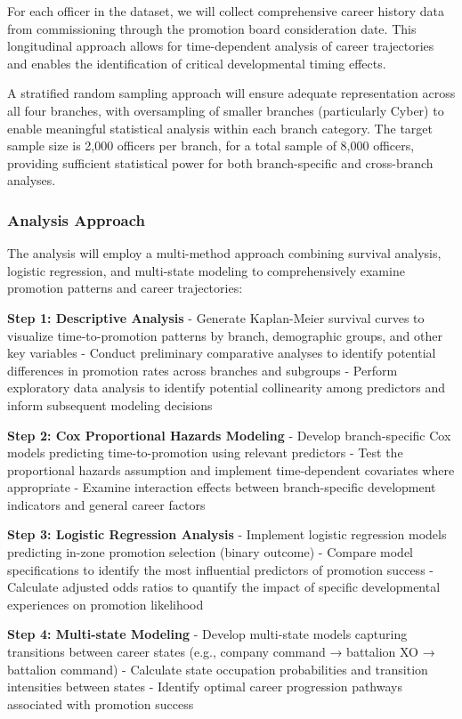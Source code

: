 \documentclass[
  letterpaper,
  DIV=11,
  numbers=noendperiod]{scrartcl}
\begin{document}
For each officer in the dataset, we will collect comprehensive career
history data from commissioning through the promotion board
consideration date. This longitudinal approach allows for time-dependent
analysis of career trajectories and enables the identification of
critical developmental timing effects.

A stratified random sampling approach will ensure adequate
representation across all four branches, with oversampling of smaller
branches (particularly Cyber) to enable meaningful statistical analysis
within each branch category. The target sample size is 2,000 officers
per branch, for a total sample of 8,000 officers, providing sufficient
statistical power for both branch-specific and cross-branch analyses.

\subsubsection{Analysis Approach}\label{analysis-approach}

The analysis will employ a multi-method approach combining survival
analysis, logistic regression, and multi-state modeling to
comprehensively examine promotion patterns and career trajectories:

\textbf{Step 1: Descriptive Analysis} - Generate Kaplan-Meier survival
curves to visualize time-to-promotion patterns by branch, demographic
groups, and other key variables - Conduct preliminary comparative
analyses to identify potential differences in promotion rates across
branches and subgroups - Perform exploratory data analysis to identify
potential collinearity among predictors and inform subsequent modeling
decisions

\textbf{Step 2: Cox Proportional Hazards Modeling} - Develop
branch-specific Cox models predicting time-to-promotion using relevant
predictors - Test the proportional hazards assumption and implement
time-dependent covariates where appropriate - Examine interaction
effects between branch-specific development indicators and general
career factors

\textbf{Step 3: Logistic Regression Analysis} - Implement logistic
regression models predicting in-zone promotion selection (binary
outcome) - Compare model specifications to identify the most influential
predictors of promotion success - Calculate adjusted odds ratios to
quantify the impact of specific developmental experiences on promotion
likelihood

\textbf{Step 4: Multi-state Modeling} - Develop multi-state models
capturing transitions between career states (e.g., company command →
battalion XO → battalion command) - Calculate state occupation
probabilities and transition intensities between states - Identify
optimal career progression pathways associated with promotion success
\end{document}
